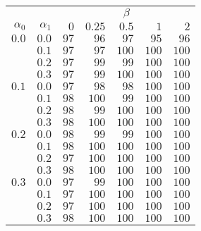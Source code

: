\begin{tabular}{rr|rrrrr}
\hline\hline
 && \multicolumn{5}{c}{$\beta$}\\
 $\alpha_0$ & $\alpha_1$ & $0$ & $0.25$ & $0.5$ & $1$ & $2$ \\ 
 \hline
$0.0$ & $0.0$ & $97$ & $96$ & $97$ & $95$ & $96$\\ 
 & $0.1$ & $97$ & $97$ & $100$ & $100$ & $100$\\ 
 & $0.2$ & $97$ & $99$ & $99$ & $100$ & $100$\\ 
 & $0.3$ & $97$ & $99$ & $100$ & $100$ & $100$\\ 
\hline 
 $0.1$ & $0.0$ & $97$ & $98$ & $98$ & $100$ & $100$\\ 
 & $0.1$ & $98$ & $100$ & $99$ & $100$ & $100$\\ 
 & $0.2$ & $98$ & $99$ & $100$ & $100$ & $100$\\ 
 & $0.3$ & $98$ & $100$ & $100$ & $100$ & $100$\\ 
\hline 
 $0.2$ & $0.0$ & $98$ & $99$ & $99$ & $100$ & $100$\\ 
 & $0.1$ & $98$ & $100$ & $100$ & $100$ & $100$\\ 
 & $0.2$ & $97$ & $100$ & $100$ & $100$ & $100$\\ 
 & $0.3$ & $98$ & $100$ & $100$ & $100$ & $100$\\ 
\hline 
 $0.3$ & $0.0$ & $97$ & $99$ & $100$ & $100$ & $100$\\ 
 & $0.1$ & $97$ & $100$ & $100$ & $100$ & $100$\\ 
 & $0.2$ & $97$ & $100$ & $100$ & $100$ & $100$\\ 
 & $0.3$ & $98$ & $100$ & $100$ & $100$ & $100$\\ 
 \hline 
 \end{tabular}